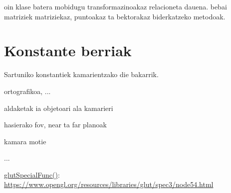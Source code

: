 \documentclass[12pt]{article}
\begin{document}
oin klase batera mobidugu transformazinoakaz relacioneta dauena. bebai matriziek matriziekaz, puntoakaz ta bektorakaz biderkatzeko metodoak.


\section{Konstante berriak}\label{constants}

Sartuniko konstantiek kamarientzako die bakarrik.

ortografikoa, ...

aldaketak ia objetoari ala kamarieri

hasierako fov, near ta far planoak

kamara motie

...




\begin{thebibliography}{9}

\underline{glutSpecialFunc()}:\\
\url{https://www.opengl.org/resources/libraries/glut/spec3/node54.html}


\end{thebibliography}
\end{document}
